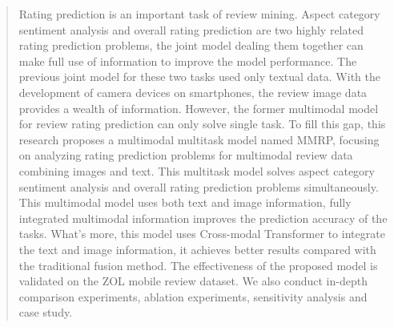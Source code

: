 \documentclass[preprint,12pt]{elsarticle}
\begin{document}
\begin{frontmatter}




\begin{abstract}
Rating prediction is an important task of review mining. Aspect category sentiment analysis and overall rating prediction are two highly related rating prediction problems, the joint model dealing them together can make full use of information to improve the model performance. The previous joint model for these two tasks used only textual data. With the development of camera devices on smartphones, the review image data provides a wealth of information. However, the former multimodal model for review rating prediction can only solve single task. To fill this gap, this research proposes a multimodal multitask model named MMRP, focusing on analyzing rating prediction problems for multimodal review data combining images and text. This multitask model solves aspect category sentiment analysis and overall rating prediction problems simultaneously. This multimodal model uses both text and image information, fully integrated multimodal information improves the prediction accuracy of the tasks. What's more, this model uses Cross-modal Transformer to integrate the text and image information, it achieves better results compared with the traditional fusion method. The effectiveness of the proposed model is validated on the ZOL mobile review dataset. We also conduct in-depth comparison experiments, ablation experiments, sensitivity analysis and case study. 
\end{abstract}



\end{frontmatter}
\end{document}
